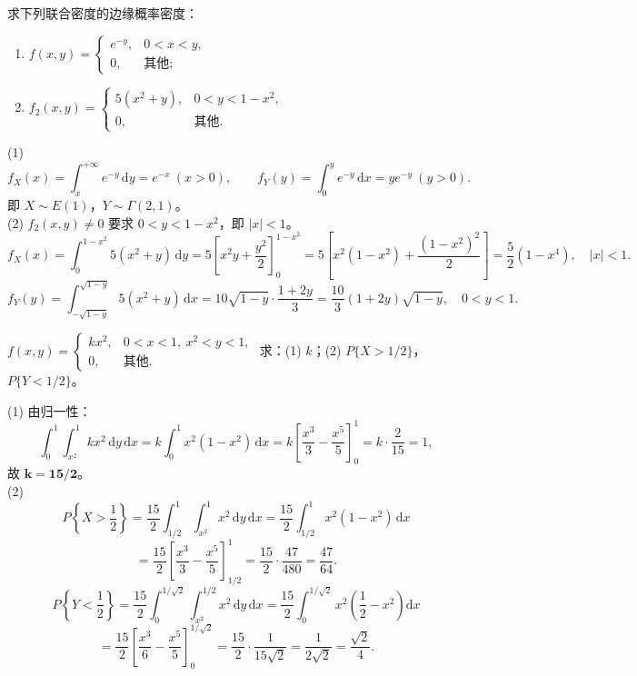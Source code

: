 \documentclass[lang=cn,11pt]{elegantbook}
\begin{document}
\begin{exercise}[两种边缘密度计算] \label{exer:3-c10}
求下列联合密度的边缘概率密度：
\begin{enumerate}
    \item[(1)] $f(x,y) = \begin{cases} e^{-y}, & 0 < x < y, \\ 0, & \text{其他}; \end{cases}$
    \item[(2)] $f_2(x,y) = \begin{cases} 5(x^2+y), & 0 < y < 1-x^2, \\ 0, & \text{其他}. \end{cases}$
\end{enumerate}
\end{exercise}
\begin{solution}
(1)
\[
f_X(x) = \int_x^{+\infty}e^{-y}\,\mathrm{d}y = e^{-x}\ (x > 0), \qquad f_Y(y) = \int_0^y e^{-y}\,\mathrm{d}x = ye^{-y}\ (y > 0).
\]
即 $X \sim E(1)$，$Y \sim \Gamma(2,1)$。\\
(2) $f_2(x,y) \neq 0$ 要求 $0 < y < 1-x^2$，即 $|x| < 1$。
\[
f_X(x) = \int_0^{1-x^2}5(x^2+y)\,\mathrm{d}y = 5\left[x^2y + \frac{y^2}{2}\right]_0^{1-x^2} = 5\left[x^2(1-x^2) + \frac{(1-x^2)^2}{2}\right] = \frac{5}{2}(1-x^4),\quad |x|<1.
\]
\[
f_Y(y) = \int_{-\sqrt{1-y}}^{\sqrt{1-y}}5(x^2+y)\,\mathrm{d}x = 10\sqrt{1-y}\cdot\frac{1+2y}{3} = \frac{10}{3}(1+2y)\sqrt{1-y},\quad 0<y<1.
\]
\end{solution}


\begin{exercise}[抛物线区域上的均匀分布] \label{exer:3-c11}
$f(x,y) = \begin{cases} kx^2, & 0 < x < 1,\ x^2 < y < 1, \\ 0, & \text{其他}. \end{cases}$
求：(1) $k$；(2) $P\{X > 1/2\}$，$P\{Y < 1/2\}$。
\end{exercise}
\begin{solution}
(1) 由归一性：
\[
\int_0^1\int_{x^2}^1 kx^2\,\mathrm{d}y\,\mathrm{d}x = k\int_0^1 x^2(1-x^2)\,\mathrm{d}x = k\left[\frac{x^3}{3} - \frac{x^5}{5}\right]_0^1 = k\cdot\frac{2}{15} = 1,
\]
故 $\boldsymbol{k = 15/2}$。\\
(2)
\[
P\left\{X > \frac{1}{2}\right\} = \frac{15}{2}\int_{1/2}^1\int_{x^2}^1 x^2\,\mathrm{d}y\,\mathrm{d}x = \frac{15}{2}\int_{1/2}^1 x^2(1-x^2)\,\mathrm{d}x
\]
\[
= \frac{15}{2}\left[\frac{x^3}{3} - \frac{x^5}{5}\right]_{1/2}^1 = \frac{15}{2}\cdot\frac{47}{480} = \frac{47}{64}.
\]
\[
P\left\{Y < \frac{1}{2}\right\} = \frac{15}{2}\int_0^{1/\sqrt{2}}\int_{x^2}^{1/2} x^2\,\mathrm{d}y\,\mathrm{d}x = \frac{15}{2}\int_0^{1/\sqrt{2}}x^2\!\left(\frac{1}{2}-x^2\right)\mathrm{d}x
\]
\[
= \frac{15}{2}\left[\frac{x^3}{6} - \frac{x^5}{5}\right]_0^{1/\sqrt{2}} = \frac{15}{2}\cdot\frac{1}{15\sqrt{2}} = \frac{1}{2\sqrt{2}} = \frac{\sqrt{2}}{4}.
\]
\end{solution}
\end{document}
